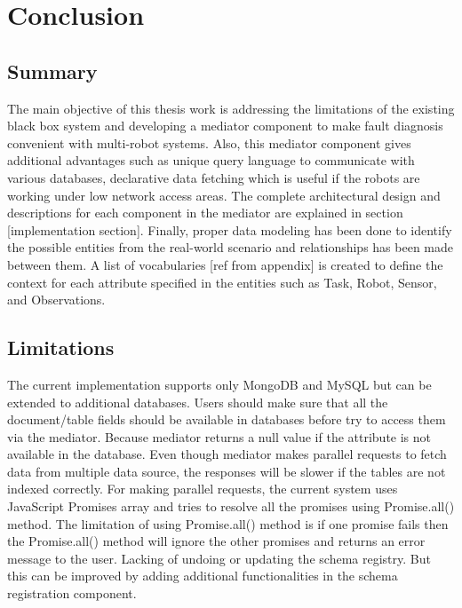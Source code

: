 

	\let\cleardoublepage\clearpage
\chapter{Conclusion}

\section{Summary}

The main objective of this thesis work is addressing the limitations of the existing black box system and developing a mediator component to make fault diagnosis convenient with multi-robot systems. Also, this mediator component gives additional advantages such as unique query language to communicate with various databases, declarative data fetching which is useful if the robots are working under low network access areas. The complete architectural design and descriptions for each component in the mediator are explained in section [implementation section]. Finally, proper data modeling has been done to identify the possible entities from the real-world scenario and relationships has been made between them. A list of vocabularies [ref from appendix] is created to define the context for each attribute specified in the entities such as Task, Robot, Sensor, and Observations.

\section{Limitations}

The current implementation supports only MongoDB and MySQL but can be extended to additional databases. Users should make sure that all the document/table fields should be available in databases before try to access them via the mediator. Because mediator returns a null value if the attribute is not available in the database. Even though mediator makes parallel requests to fetch data from multiple data source, the responses will be slower if the tables are not indexed correctly. For making parallel requests, the current system uses JavaScript Promises array and tries to resolve all the promises using Promise.all() method. The limitation of using Promise.all() method is if one promise fails then the Promise.all() method will ignore the other promises and returns an error message to the user. Lacking of undoing or updating the schema registry. But this can be improved by adding additional functionalities in the schema registration component.

